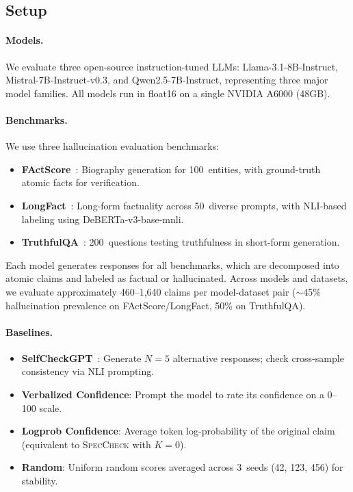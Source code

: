 \documentclass{article}
\newcommand{\speccheck}{\textsc{SpecCheck}}
\begin{document}
\subsection{Setup}

\paragraph{Models.}
We evaluate three open-source instruction-tuned LLMs: Llama-3.1-8B-Instruct, Mistral-7B-Instruct-v0.3, and Qwen2.5-7B-Instruct, representing three major model families.
All models run in float16 on a single NVIDIA A6000 (48GB).

\paragraph{Benchmarks.}
We use three hallucination evaluation benchmarks:
\begin{itemize}
    \item \textbf{FActScore}~\citep{min2023factscore}: Biography generation for 100~entities, with ground-truth atomic facts for verification.
    \item \textbf{LongFact}~\citep{wei2024longform}: Long-form factuality across 50~diverse prompts, with NLI-based labeling using DeBERTa-v3-base-mnli.
    \item \textbf{TruthfulQA}~\citep{lin2022truthfulqa}: 200~questions testing truthfulness in short-form generation.
\end{itemize}

Each model generates responses for all benchmarks, which are decomposed into atomic claims and labeled as factual or hallucinated.
Across models and datasets, we evaluate approximately 460--1,640 claims per model-dataset pair ($\sim$45\% hallucination prevalence on FActScore/LongFact, 50\% on TruthfulQA).

\paragraph{Baselines.}
\begin{itemize}
    \item \textbf{SelfCheckGPT}~\citep{manakul2023selfcheckgpt}: Generate $N{=}5$ alternative responses; check cross-sample consistency via NLI prompting.
    \item \textbf{Verbalized Confidence}: Prompt the model to rate its confidence on a 0--100 scale.
    \item \textbf{Logprob Confidence}: Average token log-probability of the original claim (equivalent to \speccheck{} with $K{=}0$).
    \item \textbf{Random}: Uniform random scores averaged across 3~seeds (42, 123, 456) for stability.
\end{itemize}
\end{document}
